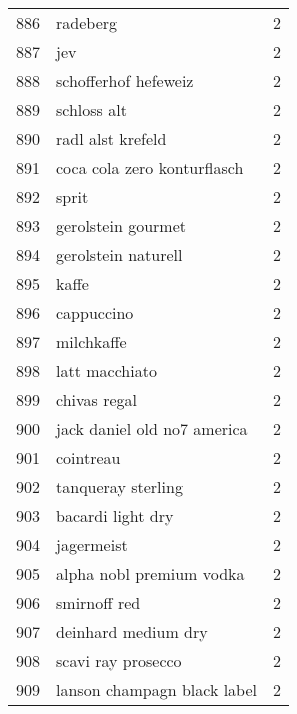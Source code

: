 \begin{tabular}{llr}
886  &                                           radeberg &      2 \\
887  &                                                jev &      2 \\
888  &                               schofferhof hefeweiz &      2 \\
889  &                                        schloss alt &      2 \\
890  &                                  radl alst krefeld &      2 \\
891  &                        coca cola zero konturflasch &      2 \\
892  &                                              sprit &      2 \\
893  &                                 gerolstein gourmet &      2 \\
894  &                                gerolstein naturell &      2 \\
895  &                                              kaffe &      2 \\
896  &                                         cappuccino &      2 \\
897  &                                         milchkaffe &      2 \\
898  &                                     latt macchiato &      2 \\
899  &                                       chivas regal &      2 \\
900  &                        jack daniel old no7 america &      2 \\
901  &                                          cointreau &      2 \\
902  &                                 tanqueray sterling &      2 \\
903  &                                  bacardi light dry &      2 \\
904  &                                         jagermeist &      2 \\
905  &                           alpha nobl premium vodka &      2 \\
906  &                                       smirnoff red &      2 \\
907  &                                deinhard medium dry &      2 \\
908  &                                 scavi ray prosecco &      2 \\
909  &                        lanson champagn black label &      2 \\

\end{tabular}
